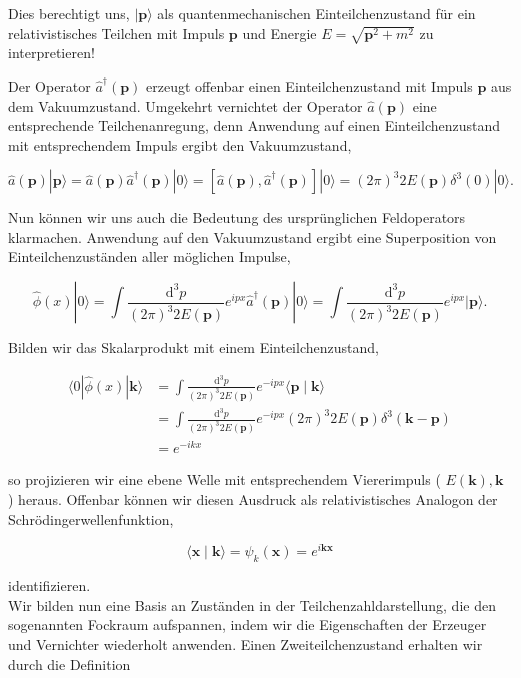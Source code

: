 \documentclass[10pt, letterpaper]{article}
\begin{document}
Dies berechtigt uns, $|\mathbf{p}\rangle$ als quantenmechanischen Einteilchenzustand für ein relativistisches Teilchen mit Impuls $\mathbf{p}$ und Energie $E=\sqrt{\mathbf{p}^{2}+m^{2}}$ zu interpretieren!

Der Operator $\hat{a}^{\dagger}(\mathbf{p})$ erzeugt offenbar einen Einteilchenzustand mit Impuls $\mathbf{p}$ aus dem Vakuumzustand. Umgekehrt vernichtet der Operator $\hat{a}(\mathbf{p})$ eine entsprechende Teilchenanregung, denn Anwendung auf einen Einteilchenzustand mit entsprechendem Impuls ergibt den Vakuumzustand,

$$
\hat{a}(\mathbf{p})|\mathbf{p}\rangle=\hat{a}(\mathbf{p}) \hat{a}^{\dagger}(\mathbf{p})|0\rangle=\left[\hat{a}(\mathbf{p}), \hat{a}^{\dagger}(\mathbf{p})\right]|0\rangle=(2 \pi)^{3} 2 E(\mathbf{p}) \delta^{3}(0)|0\rangle .
$$

Nun können wir uns auch die Bedeutung des ursprünglichen Feldoperators klarmachen. Anwendung auf den Vakuumzustand ergibt eine Superposition von Einteilchenzuständen aller möglichen Impulse,

$$
\hat{\phi}(x)|0\rangle=\int \frac{\mathrm{d}^{3} p}{(2 \pi)^{3} 2 E(\mathbf{p})} e^{i p x} \hat{a}^{\dagger}(\mathbf{p})|0\rangle=\int \frac{\mathrm{d}^{3} p}{(2 \pi)^{3} 2 E(\mathbf{p})} e^{i p x}|\mathbf{p}\rangle .
$$

Bilden wir das Skalarprodukt mit einem Einteilchenzustand,

$$
\begin{aligned}
\langle 0| \hat{\phi}(x)|\mathbf{k}\rangle & =\int \frac{\mathrm{d}^{3} p}{(2 \pi)^{3} 2 E(\mathbf{p})} e^{-i p x}\langle\mathbf{p} \mid \mathbf{k}\rangle \\
& =\int \frac{\mathrm{d}^{3} p}{(2 \pi)^{3} 2 E(\mathbf{p})} e^{-i p x}(2 \pi)^{3} 2 E(\mathbf{p}) \delta^{3}(\mathbf{k}-\mathbf{p}) \\
& =e^{-i k x}
\end{aligned}
$$

so projizieren wir eine ebene Welle mit entsprechendem Viererimpuls ( $E(\mathbf{k}), \mathbf{k}$ ) heraus. Offenbar können wir diesen Ausdruck als relativistisches Analogon der Schrödingerwellenfunktion,

$$
\langle\mathbf{x} \mid \mathbf{k}\rangle=\psi_{k}(\mathbf{x})=e^{i \mathbf{k x}}
$$

identifizieren.\\
Wir bilden nun eine Basis an Zuständen in der Teilchenzahldarstellung, die den sogenannten Fockraum aufspannen, indem wir die Eigenschaften der Erzeuger und Vernichter wiederholt anwenden. Einen Zweiteilchenzustand erhalten wir durch die Definition
\end{document}
